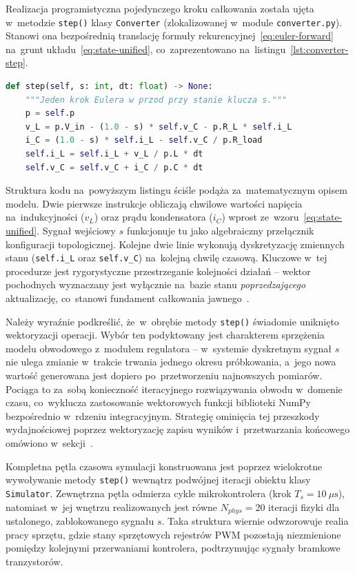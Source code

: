 Realizacja programistyczna pojedynczego kroku całkowania została ujęta w~metodzie \texttt{step()} klasy \texttt{Converter} (zlokalizowanej w~module \texttt{converter.py}). Stanowi ona bezpośrednią translację formuły rekurencyjnej~\eqref{eq:euler-forward} na~grunt układu~\eqref{eq:state-unified}, co~zaprezentowano na~listingu~\ref{lst:converter-step}.

\begin{lstlisting}[language=Python,caption={Pojedynczy krok jawnej metody Eulera dla synchronicznego przekształtnika boost.},label={lst:converter-step}]
def step(self, s: int, dt: float) -> None:
    """Jeden krok Eulera w przod przy stanie klucza s."""
    p = self.p
    v_L = p.V_in - (1.0 - s) * self.v_C - p.R_L * self.i_L
    i_C = (1.0 - s) * self.i_L - self.v_C / p.R_load
    self.i_L = self.i_L + v_L / p.L * dt
    self.v_C = self.v_C + i_C / p.C * dt
\end{lstlisting}

Struktura kodu na~powyższym listingu ściśle podąża za~matematycznym opisem modelu. Dwie pierwsze instrukcje obliczają chwilowe wartości napięcia na~indukcyjności ($v_L$) oraz prądu kondensatora ($i_C$) wprost ze~wzoru~\eqref{eq:state-unified}. Sygnał wejściowy $s$ funkcjonuje tu jako algebraiczny przełącznik konfiguracji topologicznej. Kolejne dwie linie wykonują dyskretyzację zmiennych stanu (\texttt{self.i\_L} oraz \texttt{self.v\_C}) na~kolejną chwilę czasową. Kluczowe w~tej procedurze jest rygorystyczne przestrzeganie kolejności działań -- wektor pochodnych wyznaczany jest wyłącznie na~bazie stanu \emph{poprzedzającego} aktualizację, co~stanowi fundament całkowania jawnego~\cite{hairer1993}.

Należy wyraźnie podkreślić, że~w~obrębie metody \texttt{step()} świadomie uniknięto wektoryzacji operacji. Wybór ten podyktowany jest charakterem sprzężenia modelu obwodowego z~modułem regulatora -- w~systemie dyskretnym sygnał $s$ nie ulega zmianie w~trakcie trwania jednego okresu próbkowania, a~jego nowa wartość generowana jest dopiero po~przetworzeniu najnowszych pomiarów. Pociąga to za~sobą konieczność iteracyjnego rozwiązywania obwodu w~domenie czasu, co~wyklucza zastosowanie wektorowych funkcji biblioteki NumPy bezpośrednio w~rdzeniu integracyjnym. Strategię ominięcia tej przeszkody wydajnościowej poprzez wektoryzację zapisu wyników i~przetwarzania końcowego omówiono w~sekcji~.

Kompletna pętla czasowa symulacji konstruowana jest poprzez wielokrotne wywoływanie metody \texttt{step()} wewnątrz podwójnej iteracji obiektu klasy \texttt{Simulator}. Zewnętrzna pętla odmierza cykle mikrokontrolera (krok $T_s=10~\mu\mathrm{s}$), natomiast w~jej wnętrzu realizowanych jest równe $N_{phys}=20$ iteracji fizyki dla ustalonego, zablokowanego sygnału $s$. Taka struktura wiernie odwzorowuje realia pracy sprzętu, gdzie stany sprzętowych rejestrów PWM pozostają niezmienione pomiędzy kolejnymi przerwaniami kontrolera, podtrzymując sygnały bramkowe tranzystorów.

